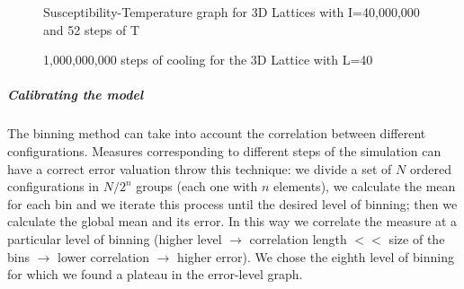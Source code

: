 \documentclass[11pt,a4paper]{article}
\begin{document}
\begin{figure}[h!]
  \centering
  
  \caption{Susceptibility-Temperature graph for 3D Lattices with I=40,000,000 and 52 steps of T}
\end{figure}

\begin{figure}[h!]
  \centering
 
  \caption{1,000,000,000 steps of cooling for the 3D Lattice with L=40}
\end{figure}

\subparagraph*{Calibrating the model}


The binning method can take into account the correlation between different configurations. Measures corresponding to different steps of the simulation can have a correct error valuation throw this technique: we divide a set of $N$ ordered configurations in $N/2^n$ groups (each one with $n$ elements), we calculate the mean for each bin and we iterate this process until the desired level of binning; then we calculate the global mean and its error. In this way we correlate the measure at a particular level of binning (higher level $\rightarrow$ correlation length $<<$ size of the bins $\rightarrow$ lower correlation $\rightarrow$ higher error). We chose the eighth level of binning for which we found a plateau in the error-level graph. 

\newpage
\end{document}
